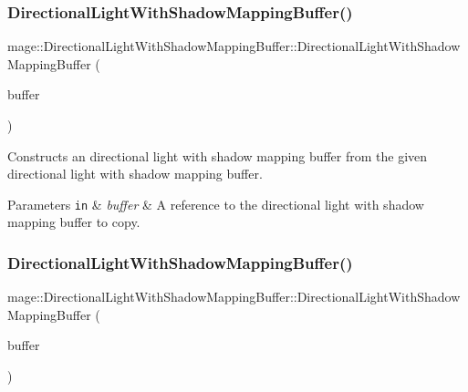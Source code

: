 \subsubsection{\texorpdfstring{Directional\+Light\+With\+Shadow\+Mapping\+Buffer()}{DirectionalLightWithShadowMappingBuffer()}\hspace{0.1cm}{\footnotesize\ttfamily [2/3]}}
{\footnotesize\ttfamily mage\+::\+Directional\+Light\+With\+Shadow\+Mapping\+Buffer\+::\+Directional\+Light\+With\+Shadow\+Mapping\+Buffer (\begin{DoxyParamCaption}\item[{const \hyperlink{structmage_1_1_directional_light_with_shadow_mapping_buffer}{Directional\+Light\+With\+Shadow\+Mapping\+Buffer} \&}]{buffer }\end{DoxyParamCaption})\hspace{0.3cm}{\ttfamily [default]}}

Constructs an directional light with shadow mapping buffer from the given directional light with shadow mapping buffer.


\begin{DoxyParams}[1]{Parameters}
\mbox{\tt in}  & {\em buffer} & A reference to the directional light with shadow mapping buffer to copy. \\
\hline
\end{DoxyParams}
\hypertarget{structmage_1_1_directional_light_with_shadow_mapping_buffer_aacd039c19b590d9d238ed1ec90d25721}{}\label{structmage_1_1_directional_light_with_shadow_mapping_buffer_aacd039c19b590d9d238ed1ec90d25721} 
\subsubsection{\texorpdfstring{Directional\+Light\+With\+Shadow\+Mapping\+Buffer()}{DirectionalLightWithShadowMappingBuffer()}\hspace{0.1cm}{\footnotesize\ttfamily [3/3]}}
{\footnotesize\ttfamily mage\+::\+Directional\+Light\+With\+Shadow\+Mapping\+Buffer\+::\+Directional\+Light\+With\+Shadow\+Mapping\+Buffer (\begin{DoxyParamCaption}\item[{\hyperlink{structmage_1_1_directional_light_with_shadow_mapping_buffer}{Directional\+Light\+With\+Shadow\+Mapping\+Buffer} \&\&}]{buffer }\end{DoxyParamCaption})\hspace{0.3cm}{\ttfamily [default]}}

